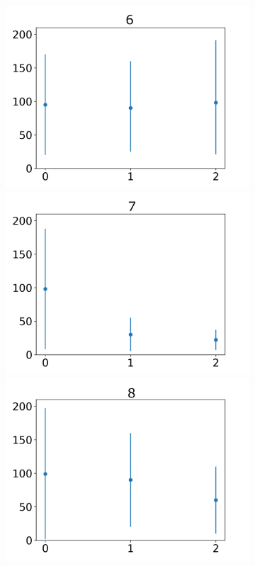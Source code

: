 \documentclass[journal]{IEEEtran}
\begin{document}
{{\begin{figure}[h!]
\begin{subfigure}{0.5\textwidth}
  \includegraphics[scale=0.27]{Images/Average_steps/f.png} 
  \centering
  \includegraphics[scale=0.27]{Images/Average_steps/g.png} 
  \includegraphics[scale=0.27]{Images/Average_steps/h.png} 

\end{subfigure}
\end{figure}}}
\end{document}

